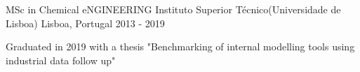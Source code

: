 

\begin{cventries}

  \cventry
    {MSc in Chemical eNGINEERING} %
    {Instituto Superior Técnico(Universidade de Lisboa)} %
    {Lisboa, Portugal} %
    {2013 - 2019} %
    {
      \begin{cvitems} %
        \item {Graduated in 2019 with a thesis "Benchmarking of internal modelling tools using industrial data follow up"}
      \end{cvitems}
    }

\end{cventries}